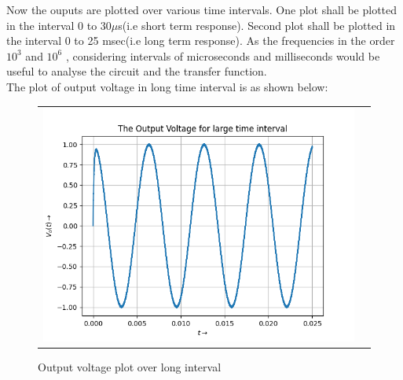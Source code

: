 \documentclass[11pt, a4paper]{article}
\begin{document}
       Now the ouputs are plotted over various time intervals. One plot shall be plotted in the interval 0 to 30$\mu$s(i.e short term response). Second plot shall be plotted in the interval 0 to 25 msec(i.e long term response). As the frequencies in the order $10^3$  and $10^6$ , considering intervals of microseconds and milliseconds would be useful to analyse the circuit and the transfer function.\\
       
       The plot of output voltage in long time interval is as shown below:
      		  \begin{figure}[H]
                    \centering
                    \setlength\tabcolsep{2pt}
                    \begin{tabular}{cc}
                       \includegraphics[scale=0.81]{Figure 6a.png}
                    \end{tabular}
                    \caption{Output voltage plot over long interval} 
                \end{figure}
       
\end{document}
